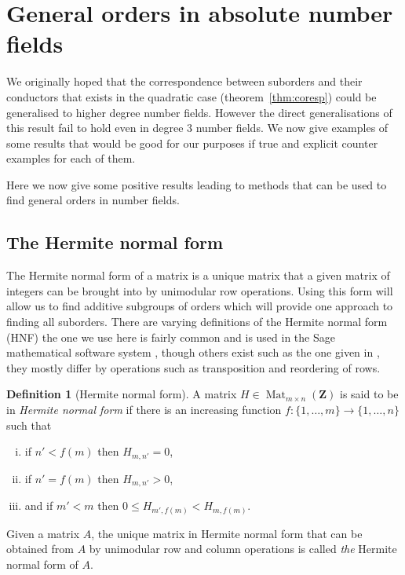 \documentclass[12pt,a4paper,abstracton,bibtotoc]{scrreprt}
\theoremstyle{definition}
\newtheorem{defn}{Definition}
\newcommand{\ZZ}{\mathbf{Z}}
\DeclareMathOperator{\Mat}{Mat}
\begin{document}
\section{General orders in absolute number fields}

We originally hoped that the correspondence between suborders and their conductors that exists in the quadratic case (theorem~\ref{thm:coresp}) could be generalised to higher degree number fields.
However the direct generalisations of this result fail to hold even in degree 3 number fields.
We now give examples of some results that would be good for our purposes if true and explicit counter examples for each of them.

Here we now give some positive results leading to methods that can be used to find general orders in number fields.

\subsection{The Hermite normal form}
The Hermite normal form of a matrix is a unique matrix that a given matrix of integers can be brought into by unimodular row operations.
Using this form will allow us to find additive subgroups of orders which will provide one approach to finding all suborders.
There are varying definitions of the Hermite normal form (HNF) the one we use here is fairly common and is used in the Sage mathematical software system \cite{sage}, though others exist such as the one given in \cite{cohen93}, they mostly differ by operations such as transposition and reordering of rows.

\begin{defn}[Hermite normal form] %
A matrix $H\in\Mat_{m\times n}(\ZZ)$ is said to be in \emph{Hermite normal form} if there is an increasing function $f\colon \{1, \ldots, m\} \to \{1,\ldots , n\}$ such that
\begin{enumerate}[i)]
\item if $n' < f(m)$ then $H_{m,n'} = 0$,
\item if $n' = f(m)$ then $H_{m,n'} > 0$,
\item and if $m' < m$ then $0\le H_{m',f(m)} < H_{m,f(m)}$.
\end{enumerate}

Given a matrix $A$, the unique matrix in Hermite normal form that can be obtained from $A$ by unimodular row and column operations is called \emph{the} Hermite normal form of $A$.
\end{defn}
\end{document}
